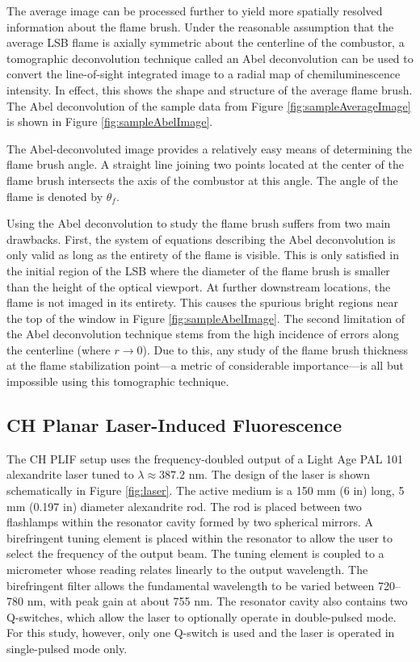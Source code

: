 The average image can be processed further to yield more spatially resolved information about the flame brush.
Under the reasonable assumption that the average LSB flame is axially symmetric about the centerline of the combustor, a tomographic deconvolution technique called an Abel deconvolution\cite{1992-dasch} can be used to convert the line-of-sight integrated image to a radial map of chemiluminescence intensity.
In effect, this shows the shape and structure of the average flame brush.
The Abel deconvolution of the sample data from Figure \ref{fig:sampleAverageImage} is shown in Figure \ref{fig:sampleAbelImage}.

The Abel-deconvoluted image provides a relatively easy means of determining the flame brush angle.
A straight line joining two points located at the center of the flame brush intersects the axis of the combustor at this angle.
The angle of the flame is denoted by \(\theta_f\).

Using the Abel deconvolution to study the flame brush suffers from two main drawbacks.
First, the system of equations describing the Abel deconvolution is only valid as long as the entirety of the flame is visible.
This is only satisfied in the initial region of the LSB where the diameter of the flame brush is smaller than the height of the optical viewport.
At further downstream locations, the flame is not imaged in its entirety.
This causes the spurious bright regions near the top of the window in Figure \ref{fig:sampleAbelImage}.
The second limitation of the Abel deconvolution technique stems from the high incidence of errors along the centerline (where \(r \to 0\)).
Due to this, any study of the flame brush thickness at the flame stabilization point---a metric of considerable importance---is all but impossible using this tomographic technique.

\subsection{CH Planar Laser-Induced Fluorescence}
\label{subsec:experimental-ch-planar-laser-induced-fluorescence}



The CH PLIF setup uses the frequency-doubled output of a Light Age PAL 101 alexandrite laser tuned to \(\lambda \approx 387.2\) nm.
The design of the laser is shown schematically in Figure \ref{fig:laser}.
The active medium is a 150 mm (6 in) long, 5 mm (0.197 in) diameter alexandrite rod.
The rod is placed between two flashlamps within the resonator cavity formed by two spherical mirrors.
A birefringent tuning element is placed within the resonator to allow the user to select the frequency of the output beam.
The tuning element is coupled to a micrometer whose reading relates linearly to the output wavelength.
The birefringent filter allows the fundamental wavelength to be varied between 720--780 nm, with peak gain at about 755 nm.
The resonator cavity also contains two Q-switches, which allow the laser to optionally operate in double-pulsed mode.
For this study, however, only one Q-switch is used and the laser is operated in single-pulsed mode only.

